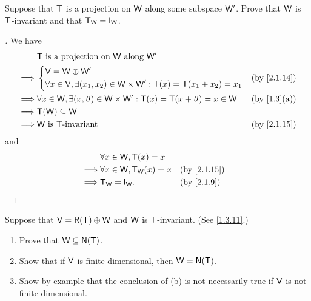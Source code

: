 \begin{ex}\label{ex:2.1.30}
  Suppose that \(\mathsf{T}\) is a projection on \(\mathsf{W}\) along some subspace \(\mathsf{W}'\).
  Prove that \(\mathsf{W}\) is \(\mathsf{T}\)-invariant and that \(\T_{\W} = \IT[\W]\).
\end{ex}

\begin{proof}[]
  We have
  \begin{align*}
             & \T \text{ is a projection on } \W \text{ along } \W'                                                                 \\
    \implies & \begin{dcases}
                 \V = \W \oplus \W' \\
                 \forall x \in \V, \exists (x_1, x_2) \in \W \times \W' : \T(x) = \T(x_1 + x_2) = x_1
               \end{dcases}  &  & \text{(by \cref{2.1.14})}                                  \\
    \implies & \forall x \in \W, \exists (x, \zv) \in \W \times \W' : \T(x) = \T(x + \zv) = x \in \W &  & \text{(by \cref{1.3}(a))} \\
    \implies & \T(\W) \subseteq \W                                                                                                  \\
    \implies & \W \text{ is } \T\text{-invariant}                                                    &  & \text{(by \cref{2.1.15})}
  \end{align*}
  and
  \begin{align*}
             & \forall x \in \W, \T(x) = x                                     \\
    \implies & \forall x \in \W, \T_{\W}(x) = x &  & \text{(by \cref{2.1.15})} \\
    \implies & \T_{\W} = \IT[\W].               &  & \text{(by \cref{2.1.9})}
  \end{align*}
\end{proof}

\begin{ex}\label{ex:2.1.31}
  Suppose that \(\V = \rg{\T} \oplus \W\) and \(\mathsf{W}\) is \(\mathsf{T}\)-invariant.
  (See \cref{1.3.11}.)
  \begin{enumerate}
    \item Prove that \(\W \subseteq \ns{\T}\).
    \item Show that if \(\mathsf{V}\) is finite-dimensional, then \(\W = \ns{\T}\).
    \item Show by example that the conclusion of (b) is not necessarily true if \(\mathsf{V}\) is not finite-dimensional.
  \end{enumerate}
\end{ex}

